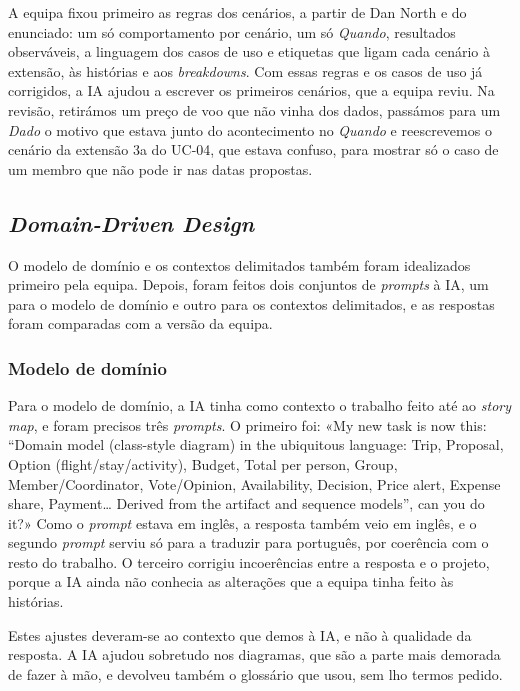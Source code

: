 A equipa fixou primeiro as regras dos cenários, a partir de Dan North e do enunciado: um só comportamento por cenário, um só
\textit{Quando}, resultados observáveis, a linguagem dos casos de uso e etiquetas que ligam cada cenário à extensão, às
histórias e aos \textit{breakdowns}. Com essas regras e os casos de uso já corrigidos, a IA ajudou a escrever os primeiros
cenários, que a equipa reviu. Na revisão, retirámos um preço de voo que não vinha dos dados, passámos para um \textit{Dado} o
motivo que estava junto do acontecimento no \textit{Quando} e reescrevemos o cenário da extensão 3a do UC-04, que estava
confuso, para mostrar só o caso de um membro que não pode ir nas datas propostas.

\subsection{\textit{Domain-Driven Design}}

O modelo de domínio e os contextos delimitados também foram idealizados primeiro pela equipa. Depois, foram feitos dois
conjuntos de \textit{prompts} à IA, um para o modelo de domínio e outro para os contextos delimitados, e as respostas foram
comparadas com a versão da equipa.

\subsubsection{Modelo de domínio}

Para o modelo de domínio, a IA tinha como contexto o trabalho feito até ao \textit{story map}, e foram precisos três
\textit{prompts}. O primeiro foi: «My new task is now this: “Domain model (class-style diagram) in the ubiquitous language:
Trip, Proposal, Option (flight/stay/activity), Budget, Total per person, Group, Member/Coordinator, Vote/Opinion,
Availability, Decision, Price alert, Expense share, Payment… Derived from the artifact and sequence models”, can you do
it?» Como o \textit{prompt} estava em inglês, a resposta também veio em inglês, e o segundo \textit{prompt} serviu só para a
traduzir para português, por coerência com o resto do trabalho. O terceiro corrigiu incoerências entre a resposta e o
projeto, porque a IA ainda não conhecia as alterações que a equipa tinha feito às histórias.

Estes ajustes deveram-se ao contexto que demos à IA, e não à qualidade da resposta. A IA ajudou sobretudo nos diagramas,
que são a parte mais demorada de fazer à mão, e devolveu também o glossário que usou, sem lho termos pedido.

